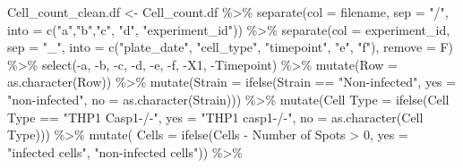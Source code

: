 \documentclass[
]{article}
\newenvironment{Shaded}{\begin{snugshade}}{\end{snugshade}}
\newcommand{\AttributeTok}[1]{\textcolor[rgb]{0.77,0.63,0.00}{#1}}
\newcommand{\DecValTok}[1]{\textcolor[rgb]{0.00,0.00,0.81}{#1}}
\newcommand{\FunctionTok}[1]{\textcolor[rgb]{0.00,0.00,0.00}{#1}}
\newcommand{\NormalTok}[1]{#1}
\newcommand{\OtherTok}[1]{\textcolor[rgb]{0.56,0.35,0.01}{#1}}
\newcommand{\SpecialCharTok}[1]{\textcolor[rgb]{0.00,0.00,0.00}{#1}}
\newcommand{\StringTok}[1]{\textcolor[rgb]{0.31,0.60,0.02}{#1}}
\begin{document}
\begin{Shaded}
\begin{Highlighting}[]
\NormalTok{Cell\_count\_clean.df }\OtherTok{\textless{}{-}}\NormalTok{ Cell\_count.df }\SpecialCharTok{\%\textgreater{}\%}
  \FunctionTok{separate}\NormalTok{(}\AttributeTok{col =}\NormalTok{ filename, }\AttributeTok{sep =} \StringTok{"/"}\NormalTok{, }\AttributeTok{into =} \FunctionTok{c}\NormalTok{(}\StringTok{"a"}\NormalTok{,}\StringTok{"b"}\NormalTok{,}\StringTok{"c"}\NormalTok{, }\StringTok{"d"}\NormalTok{, }\StringTok{"experiment\_id"}\NormalTok{)) }\SpecialCharTok{\%\textgreater{}\%}
  \FunctionTok{separate}\NormalTok{(}\AttributeTok{col =}\NormalTok{ experiment\_id, }\AttributeTok{sep =} \StringTok{"\_"}\NormalTok{, }\AttributeTok{into =} \FunctionTok{c}\NormalTok{(}\StringTok{"plate\_date"}\NormalTok{, }\StringTok{"cell\_type"}\NormalTok{, }\StringTok{"timepoint"}\NormalTok{, }\StringTok{"e"}\NormalTok{, }\StringTok{"f"}\NormalTok{), }\AttributeTok{remove =}\NormalTok{ F) }\SpecialCharTok{\%\textgreater{}\%}
  \FunctionTok{select}\NormalTok{(}\SpecialCharTok{{-}}\NormalTok{a, }\SpecialCharTok{{-}}\NormalTok{b, }\SpecialCharTok{{-}}\NormalTok{c, }\SpecialCharTok{{-}}\NormalTok{d, }\SpecialCharTok{{-}}\NormalTok{e, }\SpecialCharTok{{-}}\NormalTok{f, }\SpecialCharTok{{-}}\NormalTok{X1, }\SpecialCharTok{{-}}\NormalTok{Timepoint) }\SpecialCharTok{\%\textgreater{}\%}
  \FunctionTok{mutate}\NormalTok{(}\AttributeTok{Row =} \FunctionTok{as.character}\NormalTok{(Row)) }\SpecialCharTok{\%\textgreater{}\%}
  \FunctionTok{mutate}\NormalTok{(}\AttributeTok{Strain =} \FunctionTok{ifelse}\NormalTok{(Strain }\SpecialCharTok{==} \StringTok{"Non{-}infected"}\NormalTok{, }\AttributeTok{yes =} \StringTok{"non{-}infected"}\NormalTok{, }\AttributeTok{no =} \FunctionTok{as.character}\NormalTok{(Strain))) }\SpecialCharTok{\%\textgreater{}\%}
  \FunctionTok{mutate}\NormalTok{(}\StringTok{\textasciigrave{}}\AttributeTok{Cell Type}\StringTok{\textasciigrave{}} \OtherTok{=} \FunctionTok{ifelse}\NormalTok{(}\StringTok{\textasciigrave{}}\AttributeTok{Cell Type}\StringTok{\textasciigrave{}} \SpecialCharTok{==} \StringTok{"THP1 Casp1{-}/{-}"}\NormalTok{, }\AttributeTok{yes =} \StringTok{"THP1 casp1{-}/{-}"}\NormalTok{, }\AttributeTok{no =} \FunctionTok{as.character}\NormalTok{(}\StringTok{\textasciigrave{}}\AttributeTok{Cell Type}\StringTok{\textasciigrave{}}\NormalTok{))) }\SpecialCharTok{\%\textgreater{}\%}
  \FunctionTok{mutate}\NormalTok{( }\AttributeTok{Cells =} \FunctionTok{ifelse}\NormalTok{(}\StringTok{\textasciigrave{}}\AttributeTok{Cells {-} Number of Spots}\StringTok{\textasciigrave{}} \SpecialCharTok{\textgreater{}} \DecValTok{0}\NormalTok{, }\AttributeTok{yes =} \StringTok{"infected cells"}\NormalTok{, }\StringTok{"non{-}infected cells"}\NormalTok{))  }\SpecialCharTok{\%\textgreater{}\%}

\end{Highlighting}
\end{Shaded}
\end{document}
